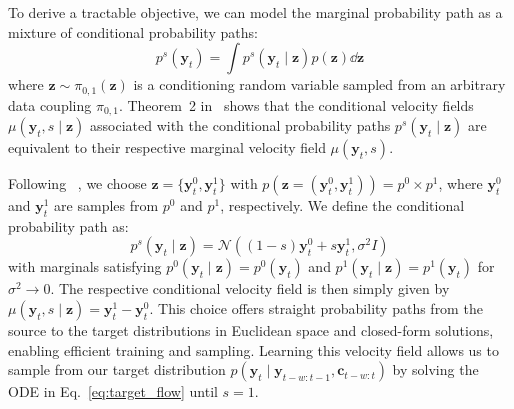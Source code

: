 \documentclass[a4paper,10pt,twocolumn,preprint,3p]{elsarticle}
\begin{document}
To derive a tractable objective, we can model the marginal probability path as a mixture of conditional probability paths:
\begin{equation}
p^s(\mathbf{y}_{t}) = \int p^s(\mathbf{y}_{t} \mid \mathbf{z})p(\mathbf{z})\dd \mathbf{z}
\end{equation}
where $\mathbf{z} \sim \pi_{0,1}(\mathbf{z})$ is a conditioning random variable sampled from an arbitrary data coupling $\pi_{0,1}$.
Theorem~2 in~\citep{Lipman2022} shows that the conditional velocity fields $\mu(\mathbf{y}_{t}, s\mid\mathbf{z})$ associated with the conditional probability paths $p^s(\mathbf{y}_{t} \mid \mathbf{z})$ are equivalent to their respective marginal velocity field $\mu(\mathbf{y}_{t}, s)$.

Following ~\citep{tong2023improving}, we choose $\mathbf{z} = \{\mathbf{y}^0_t, \mathbf{y}_t^1\}$ with $p(\mathbf{z}=(\mathbf{y}_t^0, \mathbf{y}_t^1)) = p^0 \times p^1$, where $\mathbf{y}_t^0$ and $\mathbf{y}_t^1$ are samples from $p^0$ and $p^1$, respectively. We define the conditional probability path as:
\begin{equation}
p^s(\mathbf{y}_t \mid \mathbf{z}) = \mathcal{N}((1-s)\mathbf{y}_t^0 + s\mathbf{y}_t^1, \sigma^2 I)
\label{eq:prob_path}
\end{equation}
with marginals satisfying $p^0(\mathbf{y}_t\mid\mathbf{z})= p^0(\mathbf{y}_t)$ and $p^1(\mathbf{y}_t \mid \mathbf{z}) = p^1(\mathbf{y}_t)$ for $\sigma^2 \to 0$. The respective conditional velocity field is then simply given by $\mu(\mathbf{y}_t, s\mid\mathbf{z}) = \mathbf{y}_t^1 - \mathbf{y}_t^0$.
This choice offers straight probability paths from the source to the target distributions in Euclidean space and closed-form solutions, enabling efficient training and sampling. Learning this velocity field allows us to sample from our target distribution $p(\mathbf{y}_{t} \mid \mathbf{y}_{t-w:t-1}, \mathbf{c}_{t-w:t})$ by solving the ODE in
Eq.~\eqref{eq:target_flow} until $s=1$. 
\end{document}
